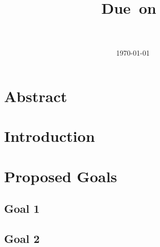 \documentclass[fleqn]{article}
\title{
	\vspace{2in}
	\textmd{\textbf{\hmwkClass\ \hmwkTitle}}\\
	\normalsize\vspace{0.1in}Due\ on\ \hmwkDueDate\\
	\large{\hmwkClassInstructor}\\
	\vspace{3in}
}
\author{\textbf{\hmwkAuthorName}}
\date{\today} %
\begin{document}
	\maketitle


\newpage
\tableofcontents
\newpage






\section{Abstract}

\section{Introduction}



\section{Proposed Goals}
\subsection{Goal 1}
\subsection{Goal 2}
\end{document}
